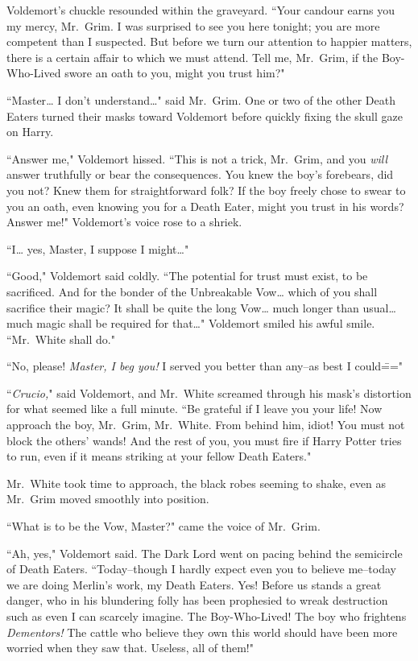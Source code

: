 Voldemort's chuckle resounded within the graveyard. ``Your candour earns you my mercy, Mr.~Grim. I was surprised to see you here tonight; you are more competent than I suspected. But before we turn our attention to happier matters, there is a certain affair to which we must attend. Tell me, Mr.~Grim, if the Boy-Who-Lived swore an oath to you, might you trust him?"

``Master{\ldots} I don't understand{\ldots}" said Mr.~Grim. One or two of the other Death Eaters turned their masks toward Voldemort before quickly fixing the skull gaze on Harry.

``Answer me," Voldemort hissed. ``This is not a trick, Mr.~Grim, and you \emph{will} answer truthfully or bear the consequences. You knew the boy's forebears, did you not? Knew them for straightforward folk? If the boy freely chose to swear to you an oath, even knowing you for a Death Eater, might you trust in his words? Answer me!" Voldemort's voice rose to a shriek.

``I{\ldots} yes, Master, I suppose I might{\ldots}"

``Good," Voldemort said coldly. ``The potential for trust must exist, to be sacrificed. And for the bonder of the Unbreakable Vow{\ldots} which of you shall sacrifice their magic? It shall be quite the long Vow{\ldots} much longer than usual{\ldots} much magic shall be required for that{\ldots}" Voldemort smiled his awful smile. ``Mr.~White shall do."

``No, please! \emph{Master, I beg you!} I served you better than any\---as best I could\==="

``\emph{Crucio,}" said Voldemort, and Mr.~White screamed through his mask's distortion for what seemed like a full minute. ``Be grateful if I leave you your life! Now approach the boy, Mr.~Grim, Mr.~White. From behind him, idiot! You must not block the others' wands! And the rest of you, you must fire if Harry Potter tries to run, even if it means striking at your fellow Death Eaters."

Mr.~White took time to approach, the black robes seeming to shake, even as Mr.~Grim moved smoothly into position.

``What is to be the Vow, Master?" came the voice of Mr.~Grim.

``Ah, yes," Voldemort said. The Dark Lord went on pacing behind the semicircle of Death Eaters. ``Today\---though I hardly expect even you to believe me\---today we are doing Merlin's work, my Death Eaters. Yes! Before us stands a great danger, who in his blundering folly has been prophesied to wreak destruction such as even I can scarcely imagine. The Boy-Who-Lived! The boy who frightens \emph{Dementors!} The cattle who believe they own this world should have been more worried when they saw that. Useless, all of them!"

